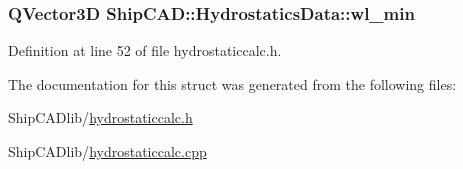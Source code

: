 \hypertarget{structShipCAD_1_1HydrostaticsData_a3bb2750b6306d9e8ae09bb4eebb1ed0c}{
\subsubsection[{wl\-\_\-min}]{\setlength{\rightskip}{0pt plus 5cm}Q\-Vector3\-D Ship\-C\-A\-D\-::\-Hydrostatics\-Data\-::wl\-\_\-min}}\label{structShipCAD_1_1HydrostaticsData_a3bb2750b6306d9e8ae09bb4eebb1ed0c}


Definition at line 52 of file hydrostaticcalc.\-h.



The documentation for this struct was generated from the following files\-:\begin{DoxyCompactItemize}
\item 
Ship\-C\-A\-Dlib/\hyperlink{hydrostaticcalc_8h}{hydrostaticcalc.\-h}\item 
Ship\-C\-A\-Dlib/\hyperlink{hydrostaticcalc_8cpp}{hydrostaticcalc.\-cpp}\end{DoxyCompactItemize}
